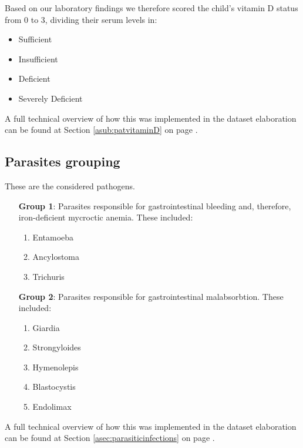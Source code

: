 Based on our laboratory findings we therefore scored the child's vitamin D status from 0 to 3, dividing their serum levels in:

\begin{itemize}
	\item Sufficient
	\item Insufficient
	\item Deficient
	\item Severely Deficient
\end{itemize}

A full technical overview of how this was implemented in the dataset elaboration can be found at Section \ref{asub:patvitaminD} on page \pageref{asub:patvitaminD}.

\subsection{Parasites grouping}\label{sub:parasites}
These are the considered pathogens.

\begin{enumerate}[leftmargin=6em]
	\item [\textbf{Group 1}:] Parasites responsible for gastrointestinal bleeding and, therefore, iron-deficient mycroctic anemia. These included:
		\begin{enumerate}[label=\alph*)]
			\item Entamoeba
			\item Ancylostoma
			\item Trichuris
		\end{enumerate}
	\item [\textbf{Group 2}:] Parasites responsible for gastrointestinal malabsorbtion. These included:
		\begin{enumerate}[label=\alph*)]
			\item Giardia
			\item Strongyloides
			\item Hymenolepis
			\item Blastocystis
			\item Endolimax
		\end{enumerate}
\end{enumerate}

A full technical overview of how this was implemented in the dataset elaboration can be found at Section \ref{asec:parasiticinfections} on page \pageref{asec:parasiticinfections}.


